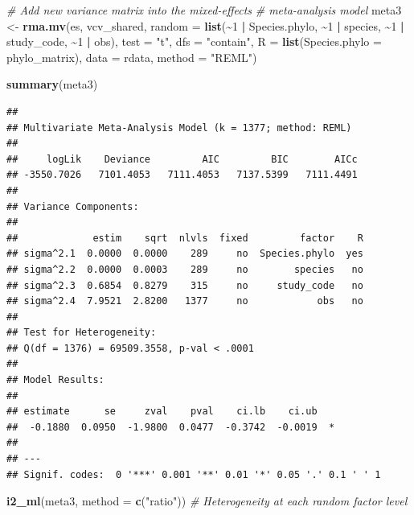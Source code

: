 \documentclass[
]{article}
\newenvironment{Shaded}{\begin{snugshade}}{\end{snugshade}}
\newcommand{\AttributeTok}[1]{\textcolor[rgb]{0.13,0.29,0.53}{#1}}
\newcommand{\CommentTok}[1]{\textcolor[rgb]{0.56,0.35,0.01}{\textit{#1}}}
\newcommand{\DecValTok}[1]{\textcolor[rgb]{0.00,0.00,0.81}{#1}}
\newcommand{\FunctionTok}[1]{\textcolor[rgb]{0.13,0.29,0.53}{\textbf{#1}}}
\newcommand{\NormalTok}[1]{#1}
\newcommand{\OtherTok}[1]{\textcolor[rgb]{0.56,0.35,0.01}{#1}}
\newcommand{\SpecialCharTok}[1]{\textcolor[rgb]{0.81,0.36,0.00}{\textbf{#1}}}
\newcommand{\StringTok}[1]{\textcolor[rgb]{0.31,0.60,0.02}{#1}}
\begin{document}
\begin{Shaded}
\begin{Highlighting}[]
\CommentTok{\# Add new variance matrix into the mixed{-}effects}
\CommentTok{\# meta{-}analysis model}
\NormalTok{meta3 }\OtherTok{\textless{}{-}} \FunctionTok{rma.mv}\NormalTok{(es, vcv\_shared, }\AttributeTok{random =} \FunctionTok{list}\NormalTok{(}\SpecialCharTok{\textasciitilde{}}\DecValTok{1} \SpecialCharTok{|}\NormalTok{ Species.phylo,}
    \SpecialCharTok{\textasciitilde{}}\DecValTok{1} \SpecialCharTok{|}\NormalTok{ species, }\SpecialCharTok{\textasciitilde{}}\DecValTok{1} \SpecialCharTok{|}\NormalTok{ study\_code, }\SpecialCharTok{\textasciitilde{}}\DecValTok{1} \SpecialCharTok{|}\NormalTok{ obs), }\AttributeTok{test =} \StringTok{"t"}\NormalTok{, }\AttributeTok{dfs =} \StringTok{"contain"}\NormalTok{,}
    \AttributeTok{R =} \FunctionTok{list}\NormalTok{(}\AttributeTok{Species.phylo =}\NormalTok{ phylo\_matrix), }\AttributeTok{data =}\NormalTok{ rdata, }\AttributeTok{method =} \StringTok{"REML"}\NormalTok{)}
\end{Highlighting}
\end{Shaded}

\begin{Shaded}
\begin{Highlighting}[]
\FunctionTok{summary}\NormalTok{(meta3)}
\end{Highlighting}
\end{Shaded}

\begin{verbatim}
## 
## Multivariate Meta-Analysis Model (k = 1377; method: REML)
## 
##     logLik    Deviance         AIC         BIC        AICc   
## -3550.7026   7101.4053   7111.4053   7137.5399   7111.4491   
## 
## Variance Components:
## 
##             estim    sqrt  nlvls  fixed         factor    R 
## sigma^2.1  0.0000  0.0000    289     no  Species.phylo  yes 
## sigma^2.2  0.0000  0.0003    289     no        species   no 
## sigma^2.3  0.6854  0.8279    315     no     study_code   no 
## sigma^2.4  7.9521  2.8200   1377     no            obs   no 
## 
## Test for Heterogeneity:
## Q(df = 1376) = 69509.3558, p-val < .0001
## 
## Model Results:
## 
## estimate      se     zval    pval    ci.lb    ci.ub    
##  -0.1880  0.0950  -1.9800  0.0477  -0.3742  -0.0019  * 
## 
## ---
## Signif. codes:  0 '***' 0.001 '**' 0.01 '*' 0.05 '.' 0.1 ' ' 1
\end{verbatim}

\begin{Shaded}
\begin{Highlighting}[]
\FunctionTok{i2\_ml}\NormalTok{(meta3, }\AttributeTok{method =} \FunctionTok{c}\NormalTok{(}\StringTok{"ratio"}\NormalTok{))  }\CommentTok{\# Heterogeneity at each random factor level}
\end{Highlighting}
\end{Shaded}
\end{document}
